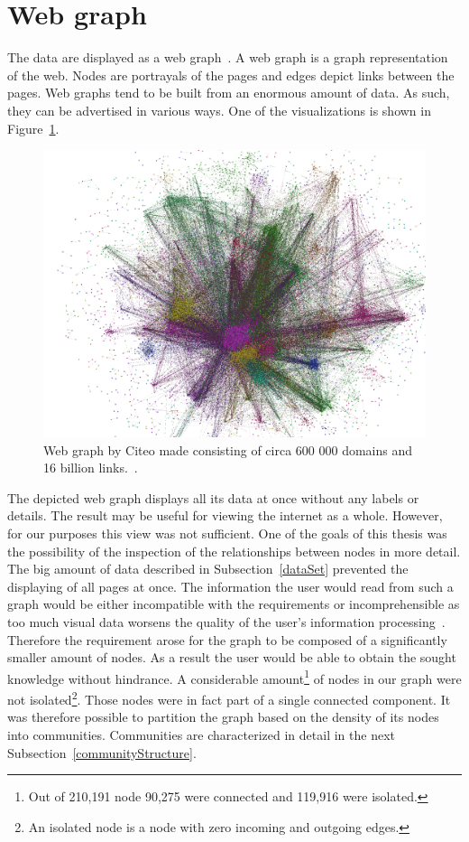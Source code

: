 \section{Web graph} \label{webGraph}
The data are displayed as a web graph~\cite{the_web_graph_overview}. A web graph is a graph representation of the web. Nodes are portrayals of the pages and edges depict links between the pages. Web graphs tend to be built from an enormous amount of data. As such, they can be advertised in various ways. One of the visualizations is shown in Figure~\ref{hugeWebGraphFireworks}. 
\begin{figure}[ht!]
  \centering
  \includegraphics[width=\textwidth]{Images/hugeWebGraphFireworks.png}
  \caption{Web graph by Citeo made consisting of circa 600 000 domains and 16 billion links.~\cite{hugeWebGraphFireworks}.}
  \label{hugeWebGraphFireworks}
\end{figure} 
The depicted web graph displays all its data at once without any labels or details. The result may be useful for viewing the internet as a whole. However, for our purposes this view was not sufficient. One of the goals of this thesis was the possibility of the inspection of the relationships between nodes in more detail. The big amount of data described in Subsection~\ref{dataSet} prevented the displaying of all pages at once. The information the user would read from such a graph would be either incompatible with the requirements or incomprehensible as too much visual data worsens the quality of the user's information processing~\cite{informationCluttering}. Therefore the requirement arose for the graph to be composed of a significantly smaller amount of nodes. As a result the user would be able to obtain the sought knowledge without hindrance. A considerable amount\footnote{Out of 210,191 node 90,275 were connected and 119,916 were isolated.} of nodes in our graph were not isolated\footnote{An isolated node is a node with zero incoming and outgoing edges.}. Those nodes were in fact part of a single connected component. It was therefore possible to partition the graph based on the density of its nodes into communities. Communities are characterized in detail in the next Subsection~\ref{communityStructure}.

